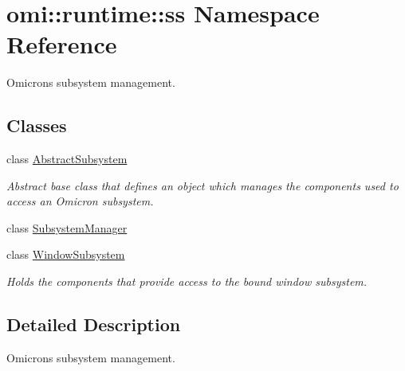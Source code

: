 \hypertarget{namespaceomi_1_1runtime_1_1ss}{}\section{omi\+:\+:runtime\+:\+:ss Namespace Reference}
\label{namespaceomi_1_1runtime_1_1ss}


Omicron\textquotesingle{}s subsystem management.  


\subsection*{Classes}
\begin{DoxyCompactItemize}
\item 
class \hyperlink{classomi_1_1runtime_1_1ss_1_1_abstract_subsystem}{Abstract\+Subsystem}
\begin{DoxyCompactList}\small\item\em Abstract base class that defines an object which manages the components used to access an Omicron subsystem. \end{DoxyCompactList}\item 
class \hyperlink{classomi_1_1runtime_1_1ss_1_1_subsystem_manager}{Subsystem\+Manager}
\item 
class \hyperlink{classomi_1_1runtime_1_1ss_1_1_window_subsystem}{Window\+Subsystem}
\begin{DoxyCompactList}\small\item\em Holds the components that provide access to the bound window subsystem. \end{DoxyCompactList}\end{DoxyCompactItemize}


\subsection{Detailed Description}
Omicron\textquotesingle{}s subsystem management. 